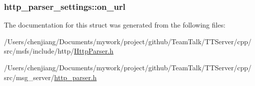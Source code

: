 \subsubsection[{on\+\_\+url}]{ http\+\_\+parser\+\_\+settings\+::on\+\_\+url}\label{structhttp__parser__settings_a9c24dfa900b49bf3439bbfba572b42fb}


The documentation for this struct was generated from the following files\+:\begin{DoxyCompactItemize}
\item 
/\+Users/chenjiang/\+Documents/mywork/project/github/\+Team\+Talk/\+T\+T\+Server/cpp/src/msfs/include/http/\hyperlink{_http_parser_8h}{Http\+Parser.\+h}\item 
/\+Users/chenjiang/\+Documents/mywork/project/github/\+Team\+Talk/\+T\+T\+Server/cpp/src/msg\+\_\+server/\hyperlink{http__parser_8h}{http\+\_\+parser.\+h}\end{DoxyCompactItemize}
